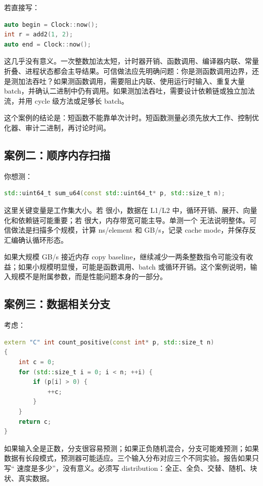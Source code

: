若直接写：

\begin{lstlisting}[language=C++]
auto begin = Clock::now();
int r = add2(1, 2);
auto end = Clock::now();
\end{lstlisting}

这几乎没有意义。一次整数加法太短，计时器开销、函数调用、编译器内联、常量折叠、进程状态都会主导结果。可信做法应先明确问题：你是测函数调用边界，还是测加法吞吐？如果测函数调用，需要阻止内联、使用运行时输入、重复大量 batch，并确认二进制中仍有调用。如果测加法吞吐，需要设计依赖链或独立加法流，并用 cycle 级方法或足够长 batch。

这个案例的结论是：短函数不能靠单次计时。短函数测量必须先放大工作、控制优化器、审计二进制，再讨论时间。

\subsection{案例二：顺序内存扫描}

你想测：

\begin{lstlisting}[language=C++]
std::uint64_t sum_u64(const std::uint64_t* p, std::size_t n);
\end{lstlisting}

这里关键变量是工作集大小。若  很小，数据在 L1/L2 中，循环开销、展开、向量化和依赖链可能重要；若  很大，内存带宽可能主导。单测一个  无法说明整体。可信做法是扫描多个规模，计算 ns/element 和 GB/s，记录 cache mode，并保存反汇编确认循环形态。

如果大规模 GB/s 接近内存 copy baseline，继续减少一两条整数指令可能没有收益；如果小规模明显慢，可能是函数调用、batch 或循环开销。这个案例说明，输入规模不是附属参数，而是性能问题本身的一部分。

\subsection{案例三：数据相关分支}

考虑：

\begin{lstlisting}[language=C++]
extern "C" int count_positive(const int* p, std::size_t n)
{
    int c = 0;
    for (std::size_t i = 0; i < n; ++i) {
        if (p[i] > 0) {
            ++c;
        }
    }
    return c;
}
\end{lstlisting}

如果输入全是正数，分支很容易预测；如果正负随机混合，分支可能难预测；如果数据有长段模式，预测器可能适应。三个输入分布对应三个不同实验。报告如果只写“ 速度是多少”，没有意义。必须写 distribution：全正、全负、交替、随机、块状、真实数据。

